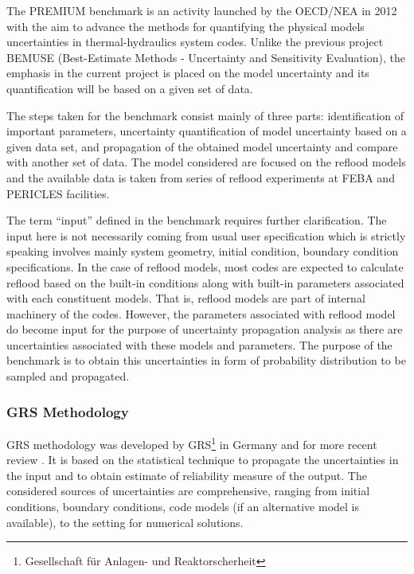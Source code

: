 \documentclass[11pt,titlepage]{article}
\begin{document}
The PREMIUM benchmark is an activity launched by the OECD/NEA in 2012 with the aim to advance the methods for quantifying the physical models uncertainties in thermal-hydraulics system codes. 
Unlike the previous project BEMUSE (Best-Estimate Methods - Uncertainty and Sensitivity Evaluation), 
the emphasis in the current project is placed on the model uncertainty and its quantification will be based on a given set of data.

The steps taken for the benchmark consist mainly of three parts: identification of important parameters, uncertainty quantification of model uncertainty based on a given data set, and propagation of the obtained model uncertainty and compare with another set of data. 
The model considered are focused on the reflood models and the available data is taken from series of reflood experiments at FEBA and PERICLES facilities.

The term ``input'' defined in the benchmark requires further clarification. 
The input here is not necessarily coming from usual user specification which is strictly speaking involves mainly system geometry, initial condition, boundary condition specifications. 
In the case of reflood models, most codes are expected to calculate reflood based on the built-in conditions along with built-in parameters associated with each constituent models. 
That is, reflood models are part of internal machinery of the codes. 
However, the parameters associated with reflood model do become input for the purpose of uncertainty propagation analysis as there are uncertainties associated with these models and parameters. 
The purpose of the benchmark is to obtain this uncertainties in form of probability distribution to be sampled and propagated. 

\subsubsection{GRS Methodology}

GRS methodology was developed by GRS\footnote{Gesellschaft f\"ur Anlagen- und Reaktorscherheit} in Germany \cite{Glaeser1994} and for more recent review \cite{Glaeser2008}. 
It is based on the statistical technique to propagate the uncertainties in the input and to obtain estimate of reliability measure of the output. 
The considered sources of uncertainties are comprehensive, ranging from initial conditions, boundary conditions, code models (if an alternative model is available), to the setting for numerical solutions.
\end{document}
